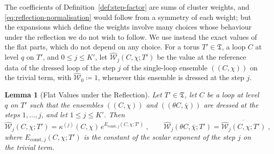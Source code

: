\documentclass[11pt]{preprint}
\numberwithin{equation}{section}
\newtheorem{lemma}[theorem]{Lemma}
\theoremstyle{definition}
\theoremstyle{remark}
\theoremstyle{plain}
\begin{document}
The coefficients of Definition~\ref{def:step-factor} are sums of cluster weights, and \eqref{eq:reflection-normalisation} would follow from a symmetry of each weight; but the expansions which define the weights involve many choices whose behaviour under the reflection we do not wish to follow. We use instead the exact values of the flat parts, which do not depend on any choice. For a torus $T' \in \mathfrak T$, a loop $C$ at level $q$ on $T'$, and $0 \leq j \leq K'$, let $\widehat{\mathcal W}_j(C, \chi; T')$ be the value at the reference data of the dressed loop of the step $j$ of the single-loop ensemble $((C, \chi))$ on the trivial term, with $\widehat{\mathcal W}_0 \coloneqq 1$, whenever this ensemble is dressed at the step $j$.

\begin{lemma}[Flat Values under the Reflection]\label{lem:flat-values}
Let $T' \in \mathfrak T$, let $C$ be a loop at level $q$ on $T'$ such that the ensembles $((C, \chi))$ and $((\theta C, \bar\chi))$ are dressed at the steps $1, \dots, j$, and let $1 \leq j \leq K'$. Then
\begin{equation}\label{eq:flat-value}
    \widehat{\mathcal W}_j(C, \chi; T') = \kappa^{(j)}(C, \chi)\,e^{E_{\mathrm{const},j}(C, \chi; T')}\;,
    \qquad
    \widehat{\mathcal W}_j(\theta C, \bar\chi; T') = \overline{\widehat{\mathcal W}_j(C, \chi; T')}\;,
\end{equation}
where $E_{\mathrm{const},j}(C, \chi; T')$ is the constant of the scalar exponent of the step $j$ on the trivial term.
\end{lemma}
\end{document}
